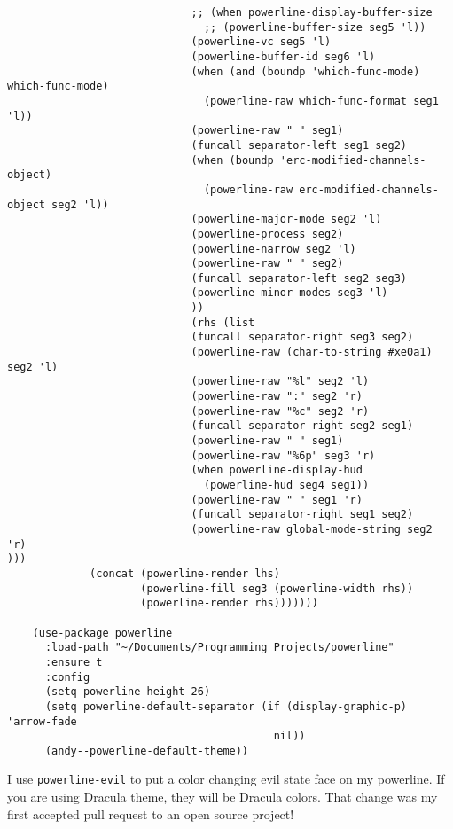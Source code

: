 \documentclass{article}
\begin{document}
\begin{verbatim}
                             ;; (when powerline-display-buffer-size
                               ;; (powerline-buffer-size seg5 'l))
                             (powerline-vc seg5 'l)
                             (powerline-buffer-id seg6 'l)
                             (when (and (boundp 'which-func-mode) which-func-mode)
                               (powerline-raw which-func-format seg1 'l))
                             (powerline-raw " " seg1)
                             (funcall separator-left seg1 seg2)
                             (when (boundp 'erc-modified-channels-object)
                               (powerline-raw erc-modified-channels-object seg2 'l))
                             (powerline-major-mode seg2 'l)
                             (powerline-process seg2)
                             (powerline-narrow seg2 'l)
                             (powerline-raw " " seg2)
                             (funcall separator-left seg2 seg3)
                             (powerline-minor-modes seg3 'l)
                             ))
                             (rhs (list 
                             (funcall separator-right seg3 seg2)
                             (powerline-raw (char-to-string #xe0a1) seg2 'l)
                             (powerline-raw "%l" seg2 'l)
                             (powerline-raw ":" seg2 'r)
                             (powerline-raw "%c" seg2 'r)
                             (funcall separator-right seg2 seg1)
                             (powerline-raw " " seg1)
                             (powerline-raw "%6p" seg3 'r)
                             (when powerline-display-hud
                               (powerline-hud seg4 seg1))
                             (powerline-raw " " seg1 'r)
                             (funcall separator-right seg1 seg2)
                             (powerline-raw global-mode-string seg2 'r)
)))
             (concat (powerline-render lhs)
                     (powerline-fill seg3 (powerline-width rhs))
                     (powerline-render rhs)))))))

    (use-package powerline
      :load-path "~/Documents/Programming_Projects/powerline"
      :ensure t
      :config
      (setq powerline-height 26)
      (setq powerline-default-separator (if (display-graphic-p) 'arrow-fade
                                          nil))
      (andy--powerline-default-theme))
\end{verbatim}

I use \texttt{powerline-evil} to put a color changing evil state face on my powerline. If you are using Dracula theme, they will be Dracula colors. That change was my first accepted pull request to an open source project!
\end{document}

